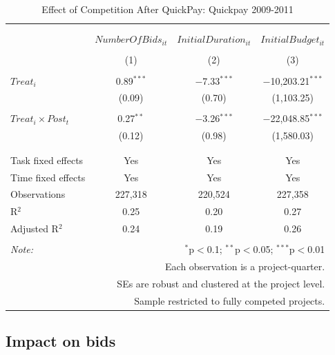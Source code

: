 \documentclass[
]{article}
\begin{document}
\begin{table}[H] \centering 
  \caption{Effect of Competition After QuickPay: Quickpay 2009-2011} 
  \label{} 
\small 
\begin{tabular}{@{\extracolsep{0pt}}lccc} 
\\[-1.8ex]\hline 
\hline \\[-1.8ex] 
\\[-1.8ex] & $NumberOfBids_{it}$ & $InitialDuration_{it}$ & $InitialBudget_{it}$ \\ 
\\[-1.8ex] & (1) & (2) & (3)\\ 
\hline \\[-1.8ex] 
 $Treat_i$ & 0.89$^{***}$ & $-$7.33$^{***}$ & $-$10,203.21$^{***}$ \\ 
  & (0.09) & (0.70) & (1,103.25) \\ 
  & & & \\ 
 $Treat_i \times Post_t$ & 0.27$^{**}$ & $-$3.26$^{***}$ & $-$22,048.85$^{***}$ \\ 
  & (0.12) & (0.98) & (1,580.03) \\ 
  & & & \\ 
\hline \\[-1.8ex] 
Task fixed effects & Yes & Yes & Yes \\ 
Time fixed effects & Yes & Yes & Yes \\ 
Observations & 227,318 & 220,524 & 227,358 \\ 
R$^{2}$ & 0.25 & 0.20 & 0.27 \\ 
Adjusted R$^{2}$ & 0.24 & 0.19 & 0.26 \\ 
\hline 
\hline \\[-1.8ex] 
\textit{Note:}  & \multicolumn{3}{r}{$^{*}$p$<$0.1; $^{**}$p$<$0.05; $^{***}$p$<$0.01} \\ 
 & \multicolumn{3}{r}{Each observation is a project-quarter.} \\ 
 & \multicolumn{3}{r}{SEs are robust and clustered at the project level.} \\ 
 & \multicolumn{3}{r}{Sample restricted to fully competed projects.} \\ 
\end{tabular} 
\end{table}

\hypertarget{impact-on-bids}{%
\subsection{Impact on bids}\label{impact-on-bids}}
\end{document}

